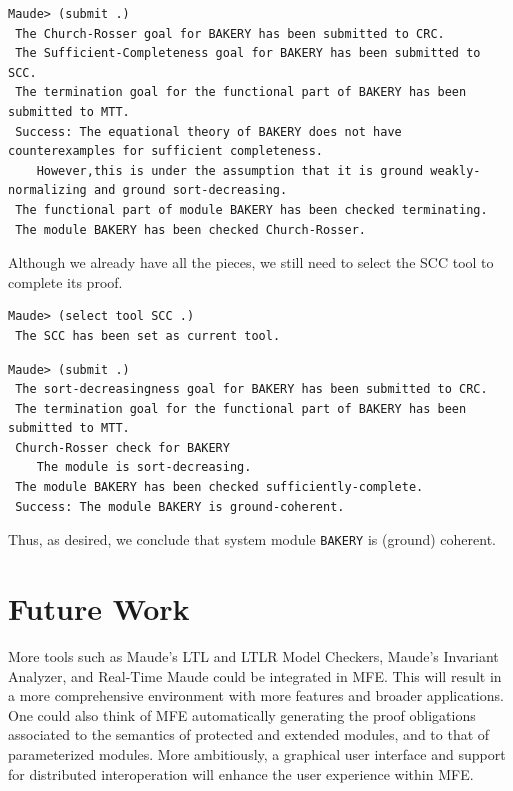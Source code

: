 \documentclass{llncs}
\begin{document}
\begin{lstlisting}[style=AMMA, language=MaudeCommand, numbers=none]
 Maude> (submit .)
 The Church-Rosser goal for BAKERY has been submitted to CRC.
 The Sufficient-Completeness goal for BAKERY has been submitted to SCC.
 The termination goal for the functional part of BAKERY has been submitted to MTT.
 Success: The equational theory of BAKERY does not have counterexamples for sufficient completeness.
    However,this is under the assumption that it is ground weakly-normalizing and ground sort-decreasing.
 The functional part of module BAKERY has been checked terminating.
 The module BAKERY has been checked Church-Rosser.
\end{lstlisting}

\noindent Although we already have all the pieces, we still need to select the SCC tool to complete its proof. 

\begin{lstlisting}[style=AMMA, language=MaudeCommand, numbers=none]
 Maude> (select tool SCC .) 
 The SCC has been set as current tool.
\end{lstlisting}

\begin{lstlisting}[style=AMMA, language=MaudeCommand, numbers=none]
 Maude> (submit .)
 The sort-decreasingness goal for BAKERY has been submitted to CRC.
 The termination goal for the functional part of BAKERY has been submitted to MTT.
 Church-Rosser check for BAKERY
    The module is sort-decreasing.
 The module BAKERY has been checked sufficiently-complete.
 Success: The module BAKERY is ground-coherent.
\end{lstlisting}

Thus, as desired, we conclude that system module \verb"BAKERY" is (ground) coherent.


\section{Future Work}

More tools such as Maude's LTL and LTLR Model Checkers,
Maude's Invariant Analyzer, and Real-Time Maude could be integrated in MFE.
This will result in a more comprehensive environment with 
more features and broader applications. 
One could also think of MFE automatically generating the proof obligations 
associated to the semantics of protected and extended modules, and to
that of parameterized modules.
More ambitiously, a graphical user interface and support for distributed 
interoperation will enhance the user experience within MFE. 
\end{document}
